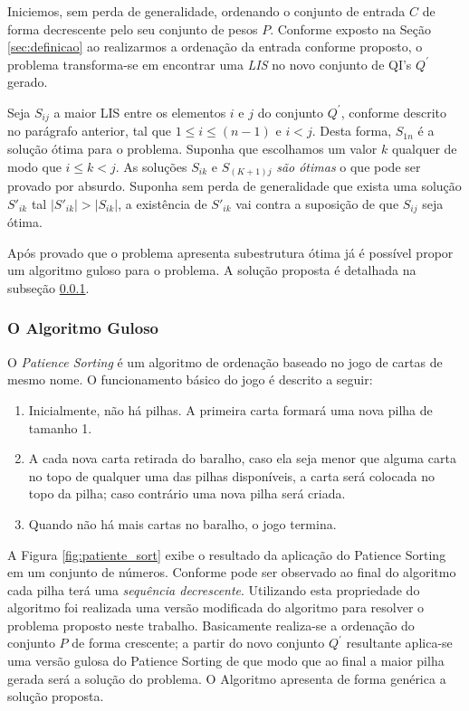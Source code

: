 \documentclass[12pt]{article}
\begin{document}
Iniciemos, sem perda de generalidade, ordenando o conjunto de entrada $C$ de forma decrescente pelo seu conjunto de pesos $P$. Conforme exposto na Seção \ref{sec:definicao} ao realizarmos a ordenação da entrada conforme proposto, o problema transforma-se em encontrar uma \textit{LIS} no novo conjunto de QI's $Q^{'}$ gerado.

Seja $S_{ij}$ a maior LIS entre os elementos $i$ e $j$ do conjunto  $Q^{'}$, conforme descrito no parágrafo anterior, tal que $1 \leq i \leq (n-1)$ e $i < j$. Desta forma, $S_{1n}$ é a solução ótima para o problema. Suponha que escolhamos um valor $k$ qualquer de modo que $ i \leq k < j$. As soluções $S_{ik}$ e $S_{(K+1)j}$ \textit{são ótimas} o que pode ser provado por absurdo. Suponha sem perda de generalidade que exista uma solução $S'_{ik}$ tal $|S'_{ik}| > |S_{ik}|$, a existência de $S'_{ik}$ vai contra a suposição de que $S_{ij}$ seja ótima.

Após provado que o problema apresenta subestrutura ótima já é possível propor um algoritmo guloso para o problema. A solução proposta é detalhada na subseção \ref{subsubsec:alg_guloso}.

\subsubsection{O Algoritmo Guloso}
\label{subsubsec:alg_guloso}

O \textit{Patience Sorting} é um algoritmo de ordenação baseado no jogo de cartas de mesmo nome. O funcionamento básico do jogo é descrito a seguir:

\begin{enumerate}
  \item Inicialmente, não há pilhas. A primeira carta formará uma nova pilha de tamanho 1.
  \item A cada nova carta retirada do baralho, caso ela seja menor que alguma carta no topo de qualquer uma das pilhas disponíveis, a carta será colocada no topo da pilha; caso contrário uma nova pilha será criada.
  \item Quando não há mais cartas no baralho, o jogo termina.
\end{enumerate}

A Figura \ref{fig:patiente_sort} exibe o resultado da aplicação do Patience Sorting em um conjunto de números. Conforme pode ser observado ao final do algoritmo cada pilha terá uma \textit{sequência decrescente}. Utilizando esta propriedade do algoritmo foi realizada uma versão modificada do algoritmo para resolver o problema proposto neste trabalho. Basicamente realiza-se a ordenação do conjunto $P$ de forma crescente; a partir do novo conjunto $Q^{'}$ resultante aplica-se uma versão gulosa do Patience Sorting de que modo que ao final a maior pilha gerada será a solução do problema. O Algoritmo apresenta de forma genérica a solução proposta.
\end{document}
